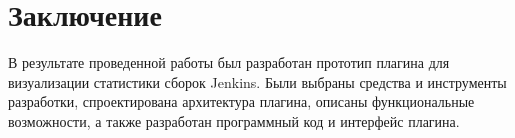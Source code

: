\chapter*{Заключение} \label{ch-conclusion}

В результате проведенной работы был разработан прототип плагина для визуализации статистики сборок Jenkins. Были выбраны средства и инструменты разработки, спроектирована архитектура плагина, описаны функциональные возможности, а также разработан программный код и интерфейс плагина.

